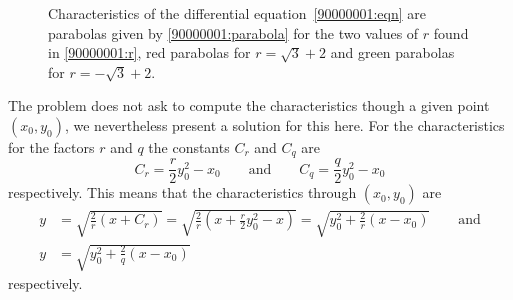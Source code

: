 \begin{loesung}
\begin{figure}
\caption{Characteristics of the differential equation~\eqref{90000001:eqn}
are parabolas given by \eqref{90000001:parabola} for the two values
of $r$ found in \eqref{90000001:r}, red parabolas for $r=\sqrt{3}+2$ and
green parabolas for $r=-\sqrt{3}+2$.
\label{90000001:char}}
\end{figure}
The problem does not ask to compute the characteristics though a given
point $(x_0,y_0)$, we nevertheless present a solution for this here.
For the characteristics for the factors $r$ and $q$ the constants
$C_r$ and $C_q$ are
\[
C_r=\frac{r}{2}y_0^2-x_0
\qquad
\text{and}
\qquad
C_q=\frac{q}{2}y_0^2-x_0
\]
respectively.
This means that the characteristics through 
$(x_0,y_0)$ are
\begin{align*}
y&=\sqrt{
\frac2r(x+C_r)
}
=
\sqrt{
\frac2r(x+
\frac{r}{2}y_0^2-x
)
}
=\sqrt{y_0^2+\frac2r(x-x_0)}
\qquad\text{and}
\\
y&
=\sqrt{y_0^2+\frac2q(x-x_0)}
\end{align*}
respectively.
\end{loesung}

